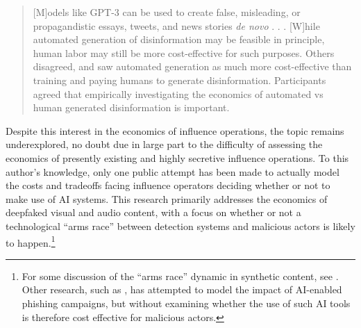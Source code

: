 \documentclass{article}
\begin{document}
\begin{quote}
  [M]odels like GPT-3 can be used to create false, misleading, or propagandistic essays, tweets, and news stories \textit{de novo} . . . [W]hile automated generation of disinformation may be feasible in principle, human labor may still be more cost-effective for such purposes. Others disagreed, and saw automated generation as much more cost-effective than training and paying humans to generate disinformation. Participants agreed that empirically investigating the economics of automated vs human generated disinformation is important. \cite{symposium}
\end{quote}

Despite this interest in the economics of influence operations, the topic remains underexplored, no doubt due in large part to the difficulty of assessing the economics of presently existing and highly secretive influence operations. To this author's knowledge, only one public attempt has been made to actually model the costs and tradeoffs facing influence operators deciding whether or not to make use of AI systems. \cite{hwang} This research primarily addresses the economics of deepfaked visual and audio content, with a focus on whether or not a technological ``arms race'' between detection systems and malicious actors is likely to happen.\footnote{For some discussion of the ``arms race'' dynamic in synthetic content, see \cite{armsrace}. Other research, such as \cite{swordsorshields}, has attempted to model the impact of AI-enabled phishing campaigns, but without examining whether the use of such AI tools is therefore cost effective for malicious actors.} 
\end{document}
